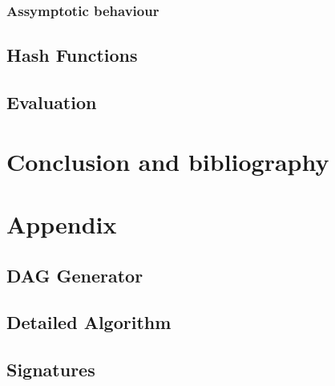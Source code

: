 \documentclass[a4paper,10pt]{report}
\theoremstyle{definition}
\theoremstyle{definition}
\begin{document}
\subsection{Assymptotic behaviour}

\section{Hash Functions}

\section{Evaluation}
\chapter{Conclusion and bibliography}
%   
\chapter{Appendix}
\section{DAG Generator}
\label{sec:daggen}

\section{Detailed Algorithm}
\label{sec:detailedalgo}

\section{Signatures}
\label{sec:datasig}

%   
\end{document}
